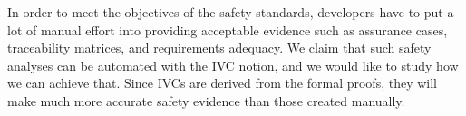 In order to meet the objectives of the safety standards, developers have to put a lot of manual effort into providing acceptable evidence such as assurance cases, traceability matrices, and requirements adequacy. We claim that such safety analyses can be automated with the IVC notion, and we would like to study how we can achieve that. Since IVCs are derived from the formal proofs, they will make much more accurate safety evidence than those created manually.

